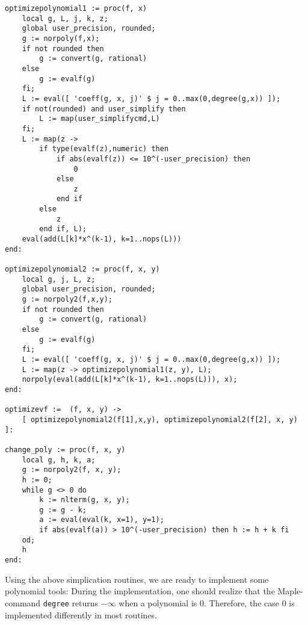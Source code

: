 \documentclass[a4paper,10pt]{article}
\begin{document}
\begin{lstlisting}[name=tools]
optimizepolynomial1 := proc(f, x)
    local g, L, j, k, z;
    global user_precision, rounded;
    g := norpoly(f,x);
    if not rounded then
        g := convert(g, rational)
    else
        g := evalf(g)
    fi;
    L := eval([ 'coeff(g, x, j)' $ j = 0..max(0,degree(g,x)) ]);
    if not(rounded) and user_simplify then
        L := map(user_simplifycmd,L)
    fi;
    L := map(z ->
        if type(evalf(z),numeric) then
            if abs(evalf(z)) <= 10^(-user_precision) then
                0
            else
                z
            end if
        else
            z
        end if, L);
    eval(add(L[k]*x^(k-1), k=1..nops(L)))
end:

optimizepolynomial2 := proc(f, x, y)
    local g, j, L, z;
    global user_precision, rounded;
    g := norpoly2(f,x,y);
    if not rounded then
        g := convert(g, rational)
    else
        g := evalf(g)
    fi;
    L := eval([ 'coeff(g, x, j)' $ j = 0..max(0,degree(g,x)) ]);
    L := map(z -> optimizepolynomial1(z, y), L);
    norpoly(eval(add(L[k]*x^(k-1), k=1..nops(L))), x);
end:

optimizevf :=  (f, x, y) ->
    [ optimizepolynomial2(f[1],x,y), optimizepolynomial2(f[2], x, y) ]:

change_poly := proc(f, x, y)
    local g, h, k, a;
    g := norpoly2(f, x, y);
    h := 0;
    while g <> 0 do
        k := nlterm(g, x, y);
        g := g - k;
        a := eval(eval(k, x=1), y=1);
        if abs(evalf(a)) > 10^(-user_precision) then h := h + k fi
    od;
    h
end:

\end{lstlisting}

Using the above simplication routines, we are ready to implement some polynomial tools:
During the implementation, one should realize that the Maple-command \verb+degree+ returns $-\infty$ when
a polynomial is $0$.  Therefore, the case $0$ is implemented differently in most routines.
\end{document}
